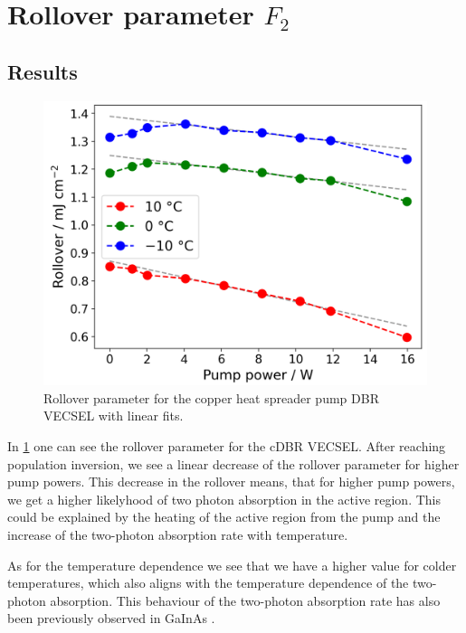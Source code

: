 \section{\texorpdfstring{Rollover parameter $F_2$}{Rollover parameter F2}}
\subsection*{Results}

\begin{figure}
    \vspace{-1.5\baselineskip}
    \centering
    \includegraphics[width=.98\textwidth]{images/param3.png}
    \caption{Rollover parameter for the copper heat spreader pump DBR VECSEL with linear fits.}
    \label{fig:f2}
\end{figure}
In \cref{fig:f2} one can see the rollover parameter for the cDBR VECSEL. After reaching population inversion, we see a linear decrease of the rollover parameter for higher pump powers. This decrease in the rollover means, that for higher pump powers, we get a higher likelyhood of two photon absorption in the active region. This could be explained by the heating of the active region from the pump and the increase of the two-photon absorption rate with temperature.

As for the temperature dependence we see that we have a higher value for colder temperatures, which also aligns with the temperature dependence of the two-photon absorption. This behaviour of the two-photon absorption rate has also been previously observed in GaInAs \cite{GaAsTemp}.
\vspace{-\baselineskip}
